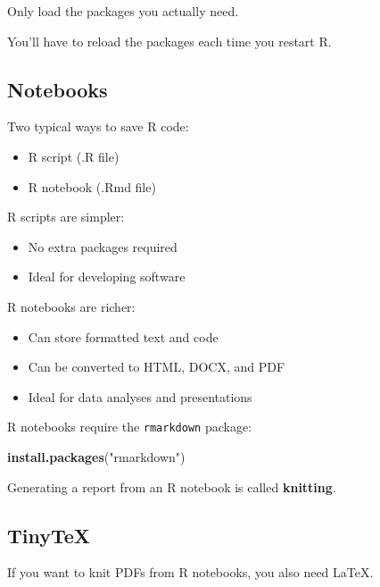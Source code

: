 \documentclass[
]{article}
\newenvironment{Shaded}{\begin{snugshade}}{\end{snugshade}}
\newcommand{\KeywordTok}[1]{\textcolor[rgb]{0.13,0.29,0.53}{\textbf{#1}}}
\newcommand{\NormalTok}[1]{#1}
\newcommand{\StringTok}[1]{\textcolor[rgb]{0.31,0.60,0.02}{#1}}
\providecommand{\tightlist}{%
  \setlength{\itemsep}{0pt}\setlength{\parskip}{0pt}}
\begin{document}
Only load the packages you actually need.

You'll have to reload the packages each time you restart R.

\hypertarget{notebooks}{%
\subsection{Notebooks}\label{notebooks}}

Two typical ways to save R code:

\begin{itemize}
\tightlist
\item
  R script (.R file)
\item
  R notebook (.Rmd file)
\end{itemize}

R scripts are simpler:

\begin{itemize}
\tightlist
\item
  No extra packages required
\item
  Ideal for developing software
\end{itemize}

R notebooks are richer:

\begin{itemize}
\tightlist
\item
  Can store formatted text and code
\item
  Can be converted to HTML, DOCX, and PDF
\item
  Ideal for data analyses and presentations
\end{itemize}

R notebooks require the \texttt{rmarkdown} package:

\begin{Shaded}
\begin{Highlighting}[]
\KeywordTok{install.packages}\NormalTok{(}\StringTok{"rmarkdown"}\NormalTok{)}
\end{Highlighting}
\end{Shaded}

Generating a report from an R notebook is called \textbf{knitting}.

\hypertarget{tinytex}{%
\subsection{TinyTeX}\label{tinytex}}

If you want to knit PDFs from R notebooks, you also need LaTeX.
\end{document}
